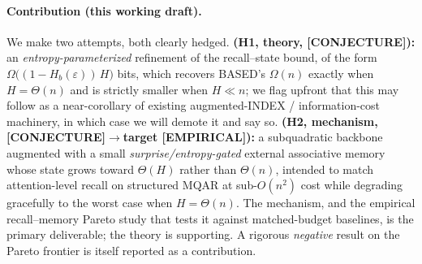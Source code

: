 \paragraph{Contribution (this working draft).}
We make two attempts, both clearly hedged.
\textbf{(H1, theory, \textbf{[CONJECTURE]}):} an \emph{entropy-parameterized} refinement of the
recall--state bound, of the form $\Omega\!\big((1-H_b(\varepsilon))\,H\big)$ bits, which recovers
BASED's $\Omega(n)$ exactly when $H=\Theta(n)$ and is strictly smaller when $H\ll n$; we flag
upfront that this may follow as a near-corollary of existing augmented-INDEX / information-cost
machinery, in which case we will demote it and say so.
\textbf{(H2, mechanism, \textbf{[CONJECTURE]}$\rightarrow$target \textbf{[EMPIRICAL]}):} a
subquadratic backbone augmented with a small \emph{surprise/entropy-gated} external associative
memory whose state grows toward $\Theta(H)$ rather than $\Theta(n)$, intended to match
attention-level recall on structured MQAR at sub-$O(n^2)$ cost while degrading gracefully to the
worst case when $H=\Theta(n)$. The mechanism, and the empirical recall--memory Pareto study that
tests it against matched-budget baselines, is the primary deliverable; the theory is supporting.
A rigorous \emph{negative} result on the Pareto frontier is itself reported as a contribution.
